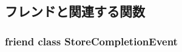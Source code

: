 \subsection{フレンドと関連する関数}
\hypertarget{classOzoneLSQ_a8f5ca1839f53a90564710f1349dd0199}{
\subsubsection[{StoreCompletionEvent}]{\setlength{\rightskip}{0pt plus 5cm}friend class {\bf StoreCompletionEvent}}}
\label{classOzoneLSQ_a8f5ca1839f53a90564710f1349dd0199}


